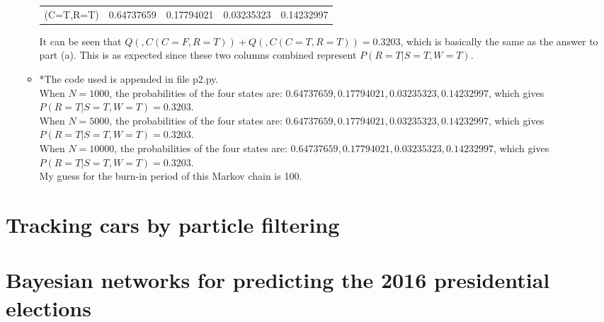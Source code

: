 \documentclass[11pt]{article}
\begin{document}
\begin{onehalfspace}
\begin{itemize}
\begin{itemize}
\begin{center}
\begin{tabular}{l | c | c | c | r}
	     (C=T,R=T) & 0.64737659 &  0.17794021 &  0.03235323 &  0.14232997\\
	    \end{tabular}
	  \end{center}
	  It can be seen that $Q(,C(C=F,R=T)) + Q(,C(C=T,R=T)) = 0.3203$, which is basically the same as the answer to part (a). This is as expected since these two columns combined represent $P(R=T|S=T,W=T)$.
	\item
	*The code used is appended in file p2.py.\\
	When $N=1000$, the probabilities of the four states are: $0.64737659,0.17794021,0.03235323,0.14232997$, which gives $P(R=T|S=T,W=T)=0.3203$.\\
	When $N=5000$, the probabilities of the four states are: $0.64737659,0.17794021,0.03235323,0.14232997$, which gives $P(R=T|S=T,W=T)=0.3203$.\\
	When $N=10000$, the probabilities of the four states are: $0.64737659,0.17794021,0.03235323,0.14232997$, which gives $P(R=T|S=T,W=T)=0.3203$.\\
	My guess for the burn-in period of this Markov chain is 100.
	\end{itemize}
\end{itemize}
\section{Tracking cars by particle filtering}
\section{Bayesian networks for predicting the 2016 presidential elections}
\end{onehalfspace}
\end{document}
